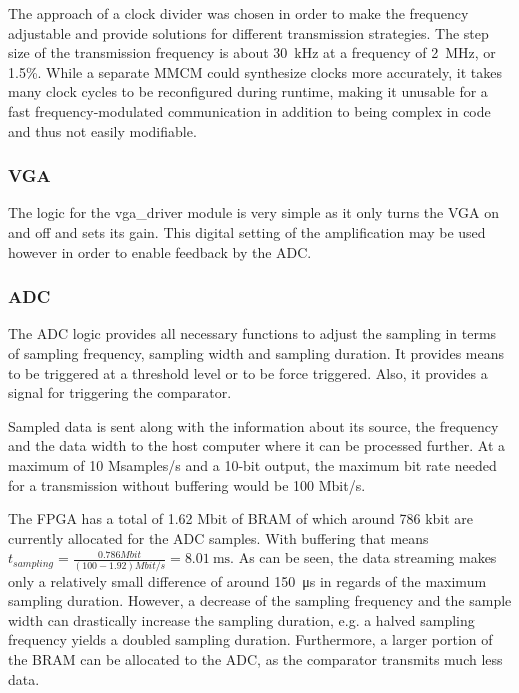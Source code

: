 \documentclass[
	english,
	ruledheaders=section, %
	class=report,%
	thesis={type=Project Seminar Report},%
	accentcolor=TUDa-1d, %
	custommargins=false,%
	marginpar=false,%
	parskip=half-,%
	fontsize=11pt,%
]{tudapub}
\newcommand{\inlcode}[1]{\textit{\detokenize{#1}}}
\begin{document}
The approach of a clock divider was chosen in order to make the frequency adjustable and provide solutions for different transmission strategies. The step size of the transmission frequency is about \SI{30}{\kilo\hertz} at a frequency of \SI{2}{\mega\hertz}, or 1.5\%. While a separate \gls{MMCM} could synthesize clocks more accurately, it takes many clock cycles to be reconfigured during runtime, making it unusable for a fast frequency-modulated communication in addition to being complex in code and thus not easily modifiable.

\subsubsection{VGA}
The logic for the vga\_driver module is very simple as it only turns the \gls{VGA} on and off and sets its gain. This digital setting of the amplification may be used however in order to enable feedback by the \gls{ADC}.

\subsubsection{ADC}
The \gls{ADC} logic provides all necessary functions to adjust the sampling in terms of sampling frequency, sampling width and sampling duration. It provides means to be triggered at a threshold level or to be force triggered. Also, it provides a \inlcode{trigger_out} signal for triggering the comparator. 

Sampled data is sent along with the information about its source, the frequency and the data width to the host computer where it can be processed further. At a maximum of 10 Msamples/s and a 10-bit output, the maximum bit rate needed for a transmission without buffering would be 100 Mbit/s.

The \gls{FPGA} has a total of 1.62 Mbit of \gls{BRAM} of which around 786 kbit are currently allocated for the \gls{ADC} samples. With buffering that means $t_{sampling} = \frac{0.786 Mbit}{(100 - 1.92) Mbit/s} = \SI{8.01}{\milli\s}$. As can be seen, the data streaming makes only a relatively small difference of around \SI{150}{\micro\s} in regards of the maximum sampling duration. However, a decrease of the sampling frequency and the sample width can drastically increase the sampling duration, e.g. a halved sampling frequency yields a doubled sampling duration. Furthermore, a larger portion of the \gls{BRAM} can be allocated to the \gls{ADC}, as the comparator transmits much less data.
\end{document}
